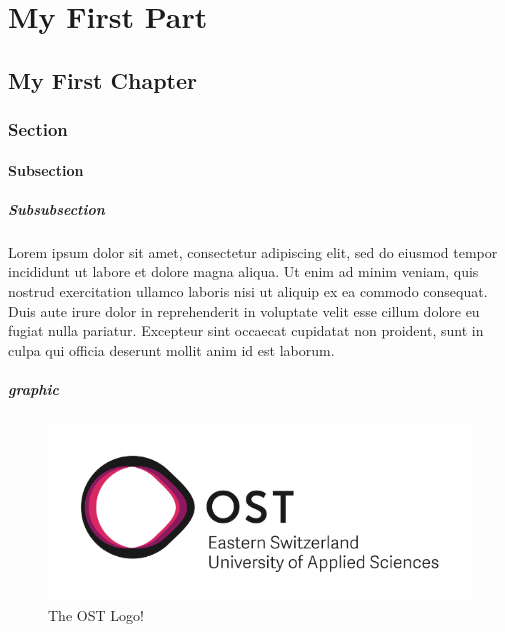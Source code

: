 \part{My First Part}

\chapter{My First Chapter}

\section{Section}



\subsection{Subsection}


\subsubsection{Subsubsection}
Lorem ipsum dolor sit amet, consectetur adipiscing elit, sed do eiusmod tempor incididunt ut labore et dolore magna aliqua. Ut enim ad minim veniam, quis nostrud exercitation ullamco laboris nisi ut aliquip ex ea commodo consequat. Duis aute irure dolor in reprehenderit in voluptate velit esse cillum dolore eu fugiat nulla pariatur. Excepteur sint occaecat cupidatat non proident, sunt in culpa qui officia deserunt mollit anim id est laborum.



\subsubsection{graphic}
\begin{figure}[H]
    \centering
    \includegraphics[scale=0.5]{img/OST_Icon}
    \caption{The OST Logo!}
\end{figure}

